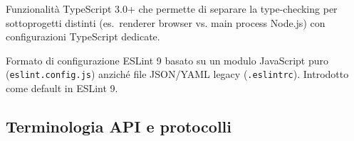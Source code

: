 \documentclass[a4paper,12pt]{article}
\begin{document}
\begin{description}[leftmargin=4cm, labelwidth=3.8cm, labelsep=0.2cm]
\item[\textbf{Project References (TS)}]
  Funzionalit\`{a} TypeScript 3.0+ che permette di separare la
  type-checking per sottoprogetti distinti (es.\ renderer browser vs.
  main process Node.js) con configurazioni TypeScript dedicate.

\item[\textbf{Flat config (ESLint)}]
  Formato di configurazione ESLint 9 basato su un modulo JavaScript puro
  (\texttt{eslint.config.js}) anzich\'{e} file JSON/YAML legacy
  (\texttt{.eslintrc}). Introdotto come default in ESLint 9.

\end{description}

\subsection*{Terminologia API e protocolli}
\end{document}
